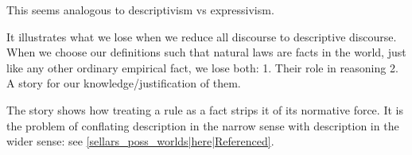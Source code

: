 
This seems analogous to descriptivism vs expressivism.

It illustrates what we lose when we reduce all discourse to descriptive discourse. When we choose our definitions such that natural laws are facts in the world, just like any other ordinary empirical fact, we lose both:
1. Their role in reasoning
2. A story for our knowledge/justification of them.

The story shows how treating a rule as a fact strips it of its normative force. It is the problem of conflating description in the narrow sense with description in the wider sense: see \ref{sellars_poss_worlds|here|Referenced}.